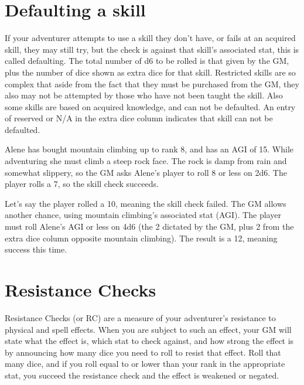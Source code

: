 \section{Defaulting a skill}
If your adventurer attempts to use a skill they don't have, or fails at an acquired skill, they may still try, but the check is against that skill's associated stat, this is called defaulting. The total number of d6 to be rolled is that given by the GM, plus the number of dice shown as extra dice for that skill. Restricted skills are so complex that aside from the fact that they must be purchased from the GM, they also may not be attempted by those who have not been taught the skill. Also some skills are based on acquired knowledge, and can not be defaulted. An entry of reserved or N/A in the extra dice column indicates that skill can not be defaulted.

Alene has bought mountain climbing up to rank 8, and has an AGI of 15. While adventuring she must climb a steep rock face. The rock is damp from rain and somewhat
slippery, so the GM asks Alene's player to roll 8 or less on 2d6. The player rolls a 7, so the skill check succeeds.

Let's say the player rolled a 10, meaning the skill check failed. The GM allows another chance, using mountain climbing's associated stat (AGI). The player must roll Alene's AGI or less on 4d6 (the 2 dictated by the GM, plus 2 from the extra dice column opposite mountain climbing). The result is a 12, meaning success this time.
\section{Resistance Checks}
Resistance Checks (or RC) are a measure of your adventurer's resistance to physical and spell effects. When you are subject to such an effect, your GM will state what the effect is, which stat to check against, and how strong the effect is by announcing how many dice you need to roll to resist that effect. Roll that many dice, and if you roll equal to or lower than your rank in the appropriate stat, you succeed the resistance check and the effect is weakened or negated.
